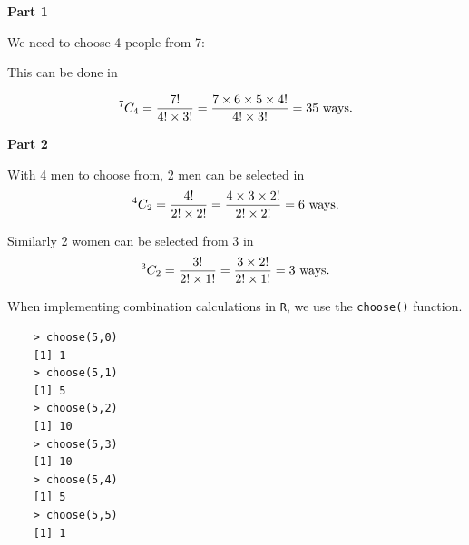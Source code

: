 \documentclass[12pt]{report}
\begin{document}
	
	{\Large
		
		\textbf{Part 1}
		
		We need to choose 4 people from 7:
		
		This can be done in
		
		\[
		^7 C_4  = {7!  \over 4! \times 3!} =  {7 \times 6 \times 5 \times 4!  \over 4! \times 3!} = 35 \mbox{ ways.}
		\]
		
		
		\textbf{Part 2}
		
		With 4 men to choose from, 2 men can be selected in \[
		^4 C_2  = {4!  \over 2! \times 2!} =  {4 \times 3 \times 2!  \over 2! \times 2!} = 6\mbox{ ways.}
		\]
		
		Similarly 2 women can be selected from 3 in
		\[
		^3 C_2  = {3!  \over 2! \times1!} =  {3 \times 2!  \over 2! \times 1!} = 3\mbox{ ways.}
		\]
		
	}
	
	When implementing combination calculations in \texttt{R}, we use the \texttt{choose()} function.
	
	\begin{verbatim}
	> choose(5,0)
	[1] 1
	> choose(5,1)
	[1] 5
	> choose(5,2)
	[1] 10
	> choose(5,3)
	[1] 10
	> choose(5,4)
	[1] 5
	> choose(5,5)
	[1] 1
	\end{verbatim}
	
\end{document}
